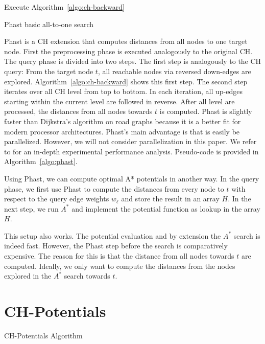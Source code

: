 \documentclass[a4paper,UKenglish,cleveref, autoref]{lipics-v2019}
\begin{document}
\begin{algorithm2e}
Execute Algorithm~\ref{algo:ch-backward}\;
\caption{Phast basic all-to-one search}
\label{algo:phast}
\end{algorithm2e}

Phast \cite{dgnw-phast-13} is a CH extension that computes distances from all nodes to one target node.
First the preprocessing phase is executed analogously to the original CH.
The query phase is divided into two steps.
The first step is analogously to the CH query:
From the target node $t$, all reachable nodes via reversed down-edges are explored.
Algorithm~\ref{algo:ch-backward} shows this first step.
The second step iterates over all CH level from top to bottom.
In each iteration, all up-edges starting within the current level are followed in reverse.
After all level are processed, the distances from all nodes towards $t$ is computed.
Phast is slightly faster than Dijkstra's algorithm on road graphs because it is a better fit for modern processor architectures.
Phast's main advantage is that is easily be parallelized.
However, we will not consider parallelization in this paper.
We refer to \cite{dgnw-phast-13} for an in-depth experimental performance analysis.
Pseudo-code is provided in Algorithm~\ref{algo:phast}.

Using Phast, we can compute optimal A* potentials in another way.
In the query phase, we first use Phast to compute the distances from every node to $t$ with respect to the query edge weights $w_\ell$ and store the result in an array $H$.
In the next step, we run $A^*$ and implement the potential function as lookup in the array $H$.

This setup also works.
The potential evaluation and by extension the $A^*$ search is indeed fast.
However, the Phast step before the search is comparatively expensive.
The reason for this is that the distance from all nodes towards $t$ are computed.
Ideally, we only want to compute the distances from the nodes explored in the $A^*$ search towards $t$.

\section{CH-Potentials}

\begin{algorithm2e}
\caption{CH-Potentials Algorithm}
\label{algo:pot}
\end{algorithm2e}
\end{document}
